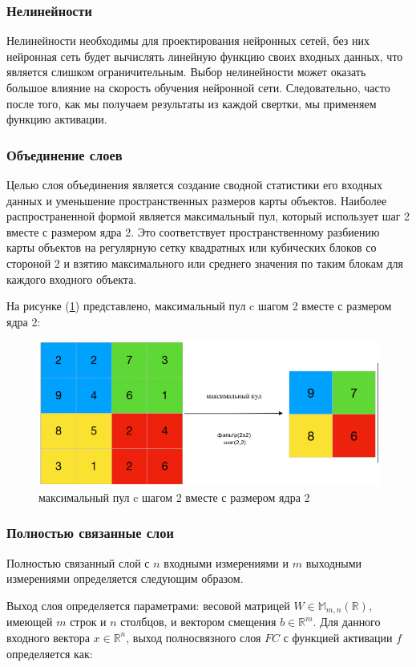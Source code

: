 \subsubsection*{Нелинейности}

Нелинейности необходимы для проектирования нейронных сетей, без них нейронная сеть будет вычислять линейную функцию своих входных данных, что является слишком ограничительным. Выбор нелинейности может оказать большое влияние на скорость обучения нейронной сети. Следовательно, часто после того, как мы получаем результаты из каждой свертки, мы применяем функцию активации.

\subsubsection*{Объединение слоев}

Целью слоя объединения является создание сводной статистики его входных данных и уменьшение пространственных размеров карты объектов. Наиболее распространенной формой является максимальный пул, который использует шаг 2 вместе с размером ядра 2. Это соответствует пространственному разбиению карты объектов на регулярную сетку квадратных или кубических блоков со стороной 2 и взятию максимального или среднего значения по таким блокам для каждого входного объекта.

На рисунке (\ref{fig:max-pool}) представлено, максимальный пул c шагом 2 вместе с размером ядра 2: 
\begin{figure}[H]
	\centering
	\includegraphics[width=0.5\linewidth]{assets/max-pooling.png}
	\caption{максимальный пул c шагом 2 вместе с размером ядра 2}
	\label{fig:max-pool}
\end{figure}

\subsubsection*{Полностью связанные слои}

Полностью связанный слой с \(n\) входными измерениями и \(m\) выходными измерениями определяется следующим образом.

Выход слоя определяется параметрами: весовой матрицей \(W \in \mathbb{M}_{m,n}(\mathbb{R})\), имеющей \(m\) строк и \(n\) столбцов, и вектором смещения \(b \in \mathbb{R}^{m}\). Для данного входного вектора \(x \in \mathbb{R}^{n}\), выход полносвязного слоя \(FC\) с функцией активации \(f\) определяется как:


